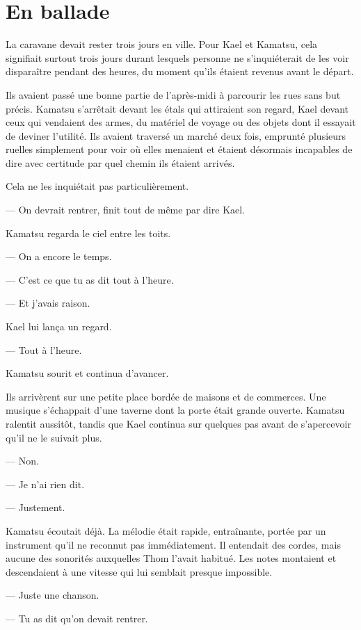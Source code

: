 \chapter{En ballade}
\label{chap:en-ballade}

La caravane devait rester trois jours en ville. Pour Kael et Kamatsu, cela
signifiait surtout trois jours durant lesquels personne ne s'inquiéterait de
les voir disparaître pendant des heures, du moment qu'ils étaient revenus
avant le départ.

Ils avaient passé une bonne partie de l'après-midi à parcourir les rues sans
but précis. Kamatsu s'arrêtait devant les étals qui attiraient son regard,
Kael devant ceux qui vendaient des armes, du matériel de voyage ou des objets
dont il essayait de deviner l'utilité. Ils avaient traversé un marché deux
fois, emprunté plusieurs ruelles simplement pour voir où elles menaient et
étaient désormais incapables de dire avec certitude par quel chemin ils
étaient arrivés.

Cela ne les inquiétait pas particulièrement.

— On devrait rentrer, finit tout de même par dire Kael.

Kamatsu regarda le ciel entre les toits.

— On a encore le temps.

— C'est ce que tu as dit tout à l'heure.

— Et j'avais raison.

Kael lui lança un regard.

— Tout à l'heure.

Kamatsu sourit et continua d'avancer.

Ils arrivèrent sur une petite place bordée de maisons et de commerces. Une
musique s'échappait d'une taverne dont la porte était grande ouverte. Kamatsu
ralentit aussitôt, tandis que Kael continua sur quelques pas avant de
s'apercevoir qu'il ne le suivait plus.

— Non.

— Je n'ai rien dit.

— Justement.

Kamatsu écoutait déjà. La mélodie était rapide, entraînante, portée par un
instrument qu'il ne reconnut pas immédiatement. Il entendait des cordes, mais
aucune des sonorités auxquelles Thom l'avait habitué. Les notes montaient et
descendaient à une vitesse qui lui semblait presque impossible.

— Juste une chanson.

— Tu as dit qu'on devait rentrer.

